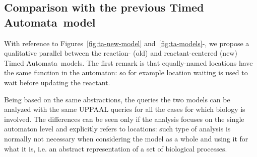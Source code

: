 \documentclass{llncs}
\newcommand{\tas}{Timed Automata}
\begin{document}
\subsection{Comparison with the previous \tas\ model}\label{sec:ta-notes}
With reference to Figures~\ref{fig:ta-new-model} and~\ref{fig:ta-models}{\protect{}\--{}\protect{}},
we propose a qualitative parallel between the reaction- (old) and reactant-centered (new) \tas\ models.
The first remark is that equally-named locations have the same function in the automaton: so for
example location {\sf waiting} is used to wait before updating the reactant.

Being based on the same abstractions, the queries the two models can be analyzed with the same
UPPAAL queries for all the cases for which biology is involved. The differences can be seen only if the
analysis focuses on the single automaton level and explicitly refers to locations: such type of analysis
is normally not necessary when considering the model as a whole and using it for what it is, i.e. an
abstract representation of a set of biological processes.
\end{document}
